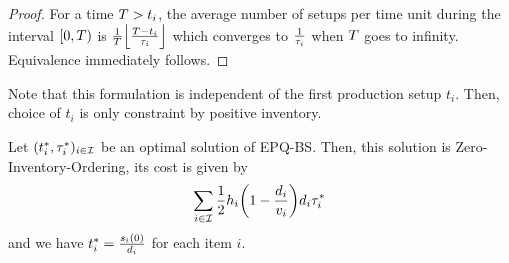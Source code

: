 \begin{proof}
For a time $T>t_i$, the average number of setups per time unit during the interval $[0,T)$ is
$\frac{1}{\horizon}\left\lfloor\frac{\horizon-t_i}{\cover_i}\right\rfloor$
which converges to $\frac{1}{\tau_i}$ when $T$ goes to infinity.
Equivalence immediately follows.
\end{proof}


Note that this formulation is independent of the first production setup $t_i$.
Then, choice of $t_i$ is only constraint by positive inventory.


\begin{lem}\label{lem:lot-size:single-line:models:ZIO}
Let $\bracket{t_i^*,\cover_i^*}_{i\in\REF}$ be an optimal solution of EPQ-BS.
Then, this solution is Zero-Inventory-Ordering, its cost is given by
\begin{equation}
  \sum_{i\in\REF}\frac{1}{2}\holding_i\bracket{1-\frac{\demand_i}{\rate_i}}\demand_i\cover_i^*
\end{equation}
and we have $t_i^*=\frac{s_i(0)}{d_i}$ for each item $i$.
\end{lem}


